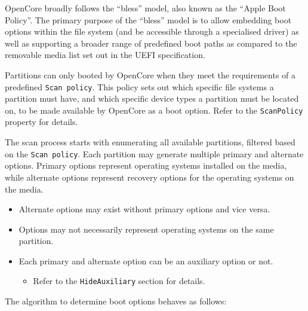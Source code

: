 \documentclass[]{article}
\providecommand{\tightlist}{%
  \setlength{\itemsep}{0pt}\setlength{\parskip}{0pt}}
\begin{document}
OpenCore broadly follows the ``bless'' model, also known as the ``Apple Boot Policy''. The primary purpose of
the ``bless'' model is to allow embedding boot options within the file system (and be accessible through a
specialised driver) as well as supporting a broader range of predefined boot paths as compared to the
removable media list set out in the UEFI specification.

Partitions can only booted by OpenCore when they meet the requirements of a predefined \texttt{Scan policy}.
This policy sets out which specific file systems a partition must have, and which specific device types
a partition must be located on, to be made available by OpenCore as a boot option.
Refer to the \texttt{ScanPolicy} property for details.

The scan process starts with enumerating all available partitions, filtered based on the \texttt{Scan policy}.
Each partition may generate multiple primary and alternate options. Primary options represent operating systems
installed on the media, while alternate options represent recovery options for the operating systems on the media.
\begin{itemize}
\tightlist
\item Alternate options may exist without primary options and vice versa.
\item Options may not necessarily represent operating systems on the same partition.
\item Each primary and alternate option can be an auxiliary option or not.
\begin{itemize}
\tightlist
  \item Refer to the \texttt{HideAuxiliary} section for details.
\end{itemize} \medskip
\end{itemize}

The algorithm to determine boot options behaves as follows:
\end{document}

